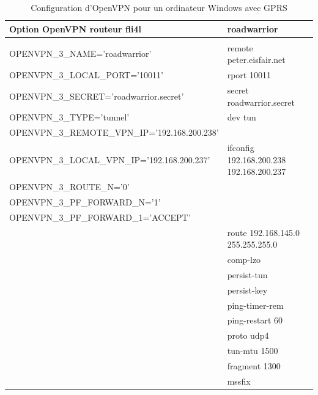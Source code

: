 \begin{table}[htbp]
  \begin{scriptsize}
    \begin{tabular}{ll}
      Option OpenVPN routeur fli4l                  & roadwarrior           \\
      \hline \\
      OPENVPN\_3\_NAME='roadwarrior'                & remote peter.eisfair.net \\
      OPENVPN\_3\_LOCAL\_PORT='10011'               & rport 10011 \\
      OPENVPN\_3\_SECRET='roadwarrior.secret'       & secret roadwarrior.secret \\
      OPENVPN\_3\_TYPE='tunnel'                     & dev tun \\
      OPENVPN\_3\_REMOTE\_VPN\_IP='192.168.200.238' & ~ \\
      OPENVPN\_3\_LOCAL\_VPN\_IP='192.168.200.237'  & ifconfig 192.168.200.238 192.168.200.237 \\
      OPENVPN\_3\_ROUTE\_N='0'                      & ~ \\
      OPENVPN\_3\_PF\_FORWARD\_N='1'                & ~ \\
      OPENVPN\_3\_PF\_FORWARD\_1='ACCEPT'           & ~ \\
      ~                                             & route 192.168.145.0 255.255.255.0 \\
      ~                                             & comp-lzo \\
      ~                                             & persist-tun \\
      ~                                             & persist-key \\
      ~                                             & ping-timer-rem \\
      ~                                             & ping-restart 60 \\
      ~                                             & proto udp4 \\
      ~                                             & tun-mtu 1500 \\
      ~                                             & fragment 1300 \\
      ~                                             & mssfix \\
    \end{tabular}
  \end{scriptsize}
  \caption{Configuration d'OpenVPN pour un ordinateur Windows avec GPRS}
\end{table}


